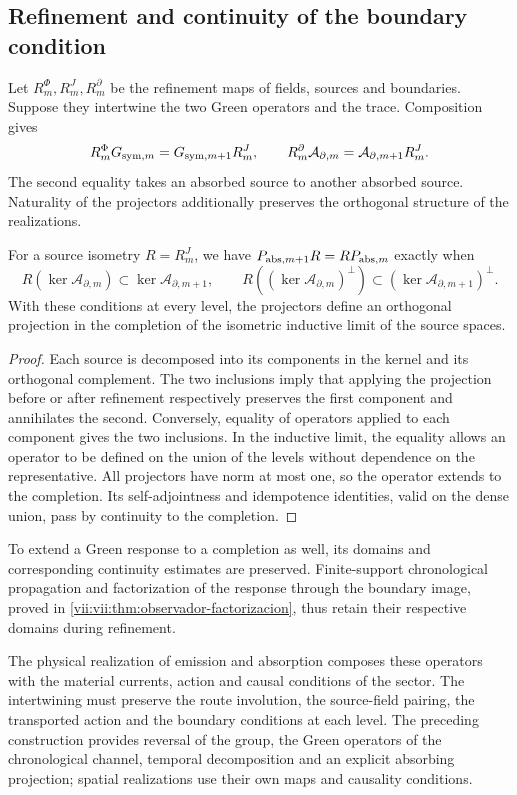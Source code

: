 \subsection{Refinement and continuity of the boundary condition}
\label{vii:vii:subsec:refinamiento-absorcion}

Let \(R_m^\Phi,R_m^J,R_m^\partial\) be the refinement maps of
fields, sources and boundaries. Suppose they intertwine the two Green operators and the
trace. Composition gives
\begin{equation}
 R_m^\Phi G_{{\rm sym},m}=G_{{\rm sym},m+1}R_m^J,\qquad
 R_m^\partial\mathcal A_{\partial,m}
 =\mathcal A_{\partial,m+1}R_m^J.
 \label{vii:vii:eq:refinamiento-lectura-absorcion}
\end{equation}
The second equality takes an absorbed source to another absorbed source.
Naturality of the projectors additionally preserves the orthogonal
structure of the realizations.

\begin{proposition}
\label{vii:vii:prop:naturalidad-proyeccion-absorcion}
For a source isometry \(R=R_m^J\), we have
\(P_{{\rm abs},m+1}R=RP_{{\rm abs},m}\) exactly when
\[
 R(\ker\mathcal A_{\partial,m})
       \subset\ker\mathcal A_{\partial,m+1},\qquad
 R((\ker\mathcal A_{\partial,m})^\perp)
       \subset(\ker\mathcal A_{\partial,m+1})^\perp.
\]
With these conditions at every level, the projectors define an
orthogonal projection in the completion of the isometric inductive limit
of the source spaces.
\end{proposition}
\begin{proof}
Each source is decomposed into its components in the kernel and its
orthogonal complement. The two inclusions imply that applying the
projection before or after refinement respectively preserves the
first component and annihilates the second. Conversely, equality of
operators applied to each component gives the two inclusions.
In the inductive limit, the equality allows an operator to be defined on the
union of the levels without dependence on the representative. All projectors
have norm at most one, so the operator extends to the
completion. Its self-adjointness and idempotence identities, valid on
the dense union, pass by continuity to the completion.
\end{proof}

To extend a Green response to a completion as well, its
domains and corresponding continuity estimates are preserved.
Finite-support chronological propagation and factorization of the
response through the boundary image, proved in
\ref{vii:vii:thm:observador-factorizacion}, thus retain their respective
domains during refinement.

The physical realization of emission and absorption composes these operators with
the material currents, action and causal conditions of the sector.
The intertwining must preserve the route involution, the source-field
pairing, the transported action and the boundary conditions at
each level. The preceding construction provides reversal of the group, the
Green operators of the chronological channel, temporal decomposition and an explicit
absorbing projection; spatial realizations use their own maps and
causality conditions.
